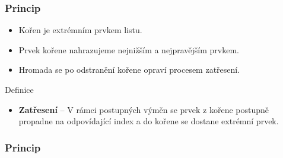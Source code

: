 \documentclass{beamer}
\begin{document}
\begin{frame}
\frametitle{Princip}

\begin{itemize}
\setlength\itemsep{0.5em}
 \item Kořen je extrémním prvkem listu.
 \item Prvek kořene nahrazujeme nejnižším a nejpravějším prvkem.
 \item Hromada se po odstranění kořene opraví procesem \alert{zatřesení}.
\end{itemize}

\vspace{0.3cm}

\begin{block}{Definice}
\begin{itemize}
\item \textbf{Zatřesení} -- V rámci postupných výměn se prvek z kořene postupně propadne na odpovídající index a do kořene se dostane extrémní prvek.
\end{itemize}
\end{block}

\end{frame}



\begin{frame}
\frametitle{Princip}
\begin{center}
\end{center}
\end{frame}
\end{document}
